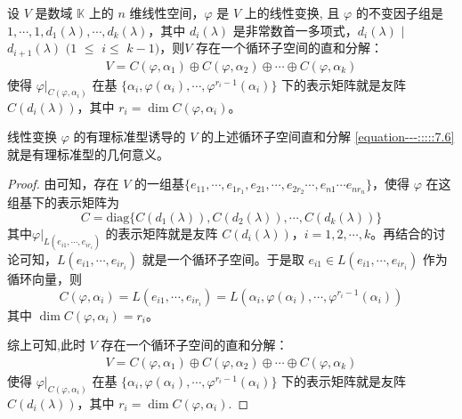 \documentclass[../../main.tex]{subfiles}%
\begin{document}
\begin{theorem}[有理标准型的几何意义]\label{theorem:有理标准型的几何意义}
设 \(V\) 是数域 \(\mathbb{K}\) 上的 \(n\) 维线性空间，\(\varphi\) 是 \(V\) 上的线性变换, 且 \(\varphi\) 的不变因子组是 \(1,\cdots,1,d_1(\lambda),\cdots,d_k(\lambda)\)，其中 \(d_i(\lambda)\) 是非常数首一多项式，$d_i(\lambda)$ $\mid$ $d_{i + 1}(\lambda)$ $(1$ $\leqslant $ $i\leqslant $  $k - 1)$，则\(V\) 存在一个循环子空间的直和分解：
\begin{align}
V = C(\varphi,\alpha_1)\oplus C(\varphi,\alpha_2)\oplus\cdots\oplus C(\varphi,\alpha_k)\label{equation---:::::7.6}
\end{align}
使得 \(\varphi|_{C(\varphi,\alpha_i)}\) 在基 \(\{\alpha_i,\varphi(\alpha_i),\cdots,\varphi^{r_i - 1}(\alpha_i)\}\) 下的表示矩阵就是友阵 \(C(d_i(\lambda))\)，其中 \(r_i = \dim C(\varphi,\alpha_i)\)。
\end{theorem}
\begin{remark}
线性变换 \(\varphi\) 的有理标准型诱导的 \(V\) 的上述循环子空间直和分解 \eqref{equation---:::::7.6}就是有理标准型的几何意义。 
\end{remark}
\begin{proof}
由可知，存在 \(V\) 的一组基$\{e_{11},\cdots ,e_{1r_1},e_{21},\cdots,e_{2r_2}\cdots,e_{n1}\cdots e_{nr_n}\}$，使得 \(\varphi\) 在这组基下的表示矩阵为
\[
C=\mathrm{diag}\{C(d_1(\lambda)),C(d_2(\lambda)),\cdots,C(d_k(\lambda))\}
\]
其中\(\varphi|_{L(e_{i1},\cdots,e_{ir_i})}\) 的表示矩阵就是友阵 \(C(d_i(\lambda))\)，\(i = 1,2,\cdots,k\)。再结合的讨论可知，\(L(e_{i1},\cdots,e_{ir_i})\) 就是一个循环子空间。于是取 \(e_{i1}\in L(e_{i1},\cdots,e_{ir_i})\) 作为循环向量，则
\[
C(\varphi,\alpha_i)=L(e_{i1},\cdots,e_{ir_i})=L(\alpha_i,\varphi(\alpha_i),\cdots,\varphi^{r_i - 1}(\alpha_i))
\]
其中 \(\dim C(\varphi,\alpha_i)=r_i\)。

综上可知,此时 \(V\) 存在一个循环子空间的直和分解：
\begin{align*}
V = C(\varphi,\alpha_1)\oplus C(\varphi,\alpha_2)\oplus\cdots\oplus C(\varphi,\alpha_k)
\end{align*}
使得 \(\varphi|_{C(\varphi,\alpha_i)}\) 在基 \(\{\alpha_i,\varphi(\alpha_i),\cdots,\varphi^{r_i - 1}(\alpha_i)\}\) 下的表示矩阵就是友阵 \(C(d_i(\lambda))\)，其中 \(r_i = \dim C(\varphi,\alpha_i)\).
\end{proof}
\end{document}
